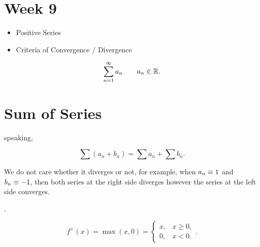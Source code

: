 \documentclass[11pt, sakura, night, 1in]{hw}
\begin{document}
\section{Week 9}

\begin{itemize}
    \item Positive Series
    \item Criteria of Convergence / Divergence
\end{itemize}

\[\sum_{n=1}^\infty a_n \qquad a_n\in\mathbb{R}.\]

\neweg{
    \[\sum_{n=1}^\infty (-1)^n, \quad \sum_{n=1}^\infty \sin (nx).\]
}

\section{Sum of Series}

\underline{} speaking,

\[\sum (a_n+b_n) = \sum a_n + \sum b_n.\]

We do not care whether it diverges or not, for example, when $a_n\equiv 1$ and $b_n\equiv -1$, then both series at the right side diverges however the series at the left side converges.

.

\[f^+(x)=\max (x,0) = \begin{cases}
    x, & x\geq 0,\\
    0, & x<0.
\end{cases}.\]
\begin{center}
    
\end{center}
\end{document}
